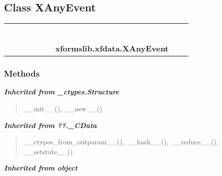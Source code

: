 \subsection{Class XAnyEvent}

    \label{xformslib:xfdata:XAnyEvent}
\begin{tabular}{cccccccccc}
\multicolumn{2}{r}{\settowidth{\BCL}{object}\multirow{2}{\BCL}{object}}
&&
&&
&&
  \\\cline{3-3}
  &&\multicolumn{1}{c|}{}
&&
&&
&&
  \\
\multicolumn{4}{r}{\settowidth{\BCL}{??.\_CData}\multirow{2}{\BCL}{??.\_CData}}
&&
&&
  \\\cline{5-5}
  &&&&\multicolumn{1}{c|}{}
&&
&&
  \\
\multicolumn{6}{r}{\settowidth{\BCL}{\_ctypes.Structure}\multirow{2}{\BCL}{\_ctypes.Structure}}
&&
  \\\cline{7-7}
  &&&&&&\multicolumn{1}{c|}{}
&&
  \\
&&&&&&\multicolumn{2}{l}{\textbf{xformslib.xfdata.XAnyEvent}}
\end{tabular}



  \subsubsection{Methods}


\large{\textbf{\textit{Inherited from \_ctypes.Structure}}}

\begin{quote}
\_\_init\_\_(), \_\_new\_\_()
\end{quote}

\large{\textbf{\textit{Inherited from ??.\_CData}}}

\begin{quote}
\_\_ctypes\_from\_outparam\_\_(), \_\_hash\_\_(), \_\_reduce\_\_(), \_\_setstate\_\_()
\end{quote}

\large{\textbf{\textit{Inherited from object}}}

